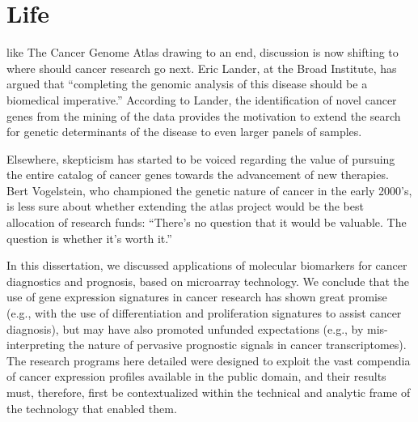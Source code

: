 \section{Life}
\label{life-discussion}



 like The Cancer Genome Atlas drawing to an end,
discussion is now shifting to where should cancer research go next.  Eric
Lander, at the Broad Institute, has argued that ``completing the genomic
analysis of this disease should be a biomedical
imperative.''\cite{lawrence_discovery_2014} According to Lander, the
identification of novel cancer genes from the mining of the 
data provides the motivation to extend the search for genetic determinants of
the disease to even larger panels of samples.

Elsewhere, skepticism has started to be voiced regarding the value of pursuing
the entire catalog of cancer genes towards the advancement of new therapies.
Bert Vogelstein, who championed the genetic nature of cancer in the early
2000's, is less sure about whether extending the atlas project would be the best
allocation of research funds: ``There’s no question that it would be
valuable. The question is whether it’s worth it.''\cite{zimmer_catalog_2014}

\medskip

In this dissertation, we discussed applications of molecular biomarkers for
cancer diagnostics and prognosis, based on microarray technology.  We conclude
that the use of gene expression signatures in cancer research has shown great
promise (e.g., with the use of differentiation and proliferation signatures to
assist cancer diagnosis), but may have also promoted unfunded expectations
(e.g., by mis-interpreting the nature of pervasive prognostic signals in cancer
transcriptomes).  The research programs here detailed were designed to exploit
the vast compendia of cancer expression profiles available in the public
domain, and their results must, therefore, first be contextualized within the
technical and analytic frame of the technology that enabled them.

